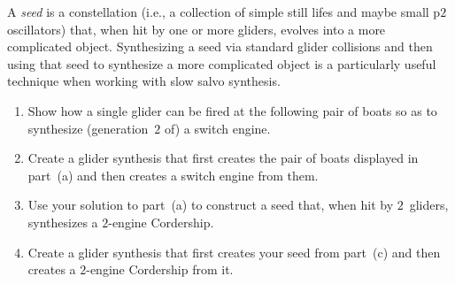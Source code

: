 \begin{multicols}{2}
\begin{problem}\label{exer:2_engine_corder_seed}
	A \emph{seed} is a constellation (i.e., a collection of simple still lifes and maybe small p$2$ oscillators) that, when hit by one or more gliders, evolves into a more complicated object. Synthesizing a seed via standard glider collisions and then using that seed to synthesize a more complicated object is a particularly useful technique when working with slow salvo synthesis.
	\begin{enumerate}[label=(\alph*)]
		\item Show how a single glider can be fired at the following pair of boats so as to synthesize (generation~$2$ of) a switch engine.
		\begin{center}
		\end{center}
		
		
		\item Create a glider synthesis that first creates the pair of boats displayed in part~(a) and then creates a switch engine from them.
		
		\item Use your solution to part~(a) to construct a seed that, when hit by $2$~gliders, synthesizes a $2$-engine Cordership.
		
		\item Create a glider synthesis that first creates your seed from part~(c) and then creates a $2$-engine Cordership from it.
	\end{enumerate}
\end{problem}

\end{multicols}
\normalsize\vspace*{0.01cm}
